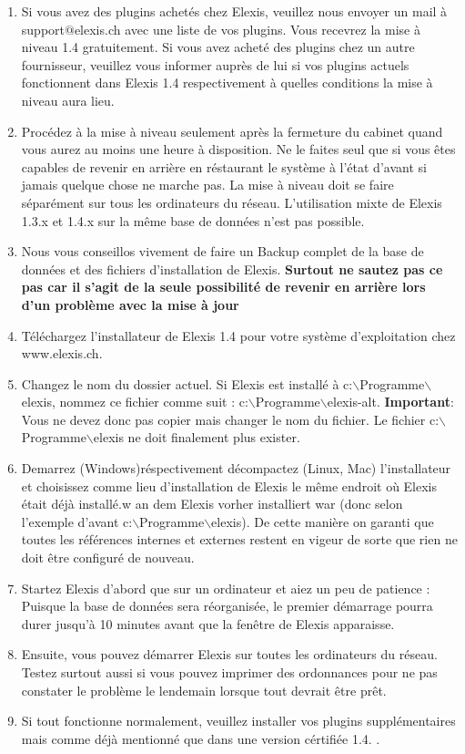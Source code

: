 \documentclass[a4paper]{scrartcl}
\begin{document}
\begin{enumerate}
\item Si vous avez des plugins achetés chez Elexis, veuillez nous envoyer un mail à  support$@$elexis.ch avec une liste de vos plugins. Vous recevrez la mise à niveau 1.4 gratuitement. Si vous avez acheté des plugins chez un autre fournisseur, veuillez vous informer auprès de lui si vos plugins actuels fonctionnent dans Elexis 1.4 respectivement à quelles conditions la mise à niveau aura lieu.

\item Procédez à la mise à niveau seulement après la fermeture du cabinet quand vous aurez au moins une heure à disposition. Ne le faites seul que si vous êtes capables de revenir en arrière en réstaurant le système à l'état d'avant si jamais quelque chose ne marche pas. La mise à niveau doit se faire séparément sur tous les ordinateurs du réseau. L'utilisation mixte de Elexis 1.3.x et 1.4.x sur la même base de données n'est pas possible.
\item Nous vous conseillos vivement de faire un Backup complet de la base de données et des fichiers d'installation de Elexis. \textbf{Surtout ne sautez pas ce pas car il s'agit de la seule possibilité de revenir en arrière lors d'un problème avec la mise à jour }
\item Téléchargez l'installateur de Elexis 1.4 pour votre système d'exploitation chez www.elexis.ch.
\item Changez le nom du dossier actuel. Si Elexis est installé à c:$\backslash$Programme$\backslash$elexis, nommez ce fichier comme suit : c:$\backslash$Programme$\backslash$elexis-alt. \textbf{Important}: Vous ne devez donc pas copier mais changer le nom du fichier. Le fichier c:$\backslash$Programme$\backslash$elexis ne doit finalement plus exister.
\item Demarrez (Windows)réspectivement décompactez (Linux, Mac) l'installateur et choisissez comme lieu d'installation de Elexis le même endroit où Elexis était déjà installé.w an dem Elexis vorher installiert war (donc selon l'exemple d'avant c:$\backslash$Programme$\backslash$elexis). De cette manière on garanti que toutes les références internes et externes restent en vigeur de sorte que rien ne doit être configuré de nouveau.  
\item Startez Elexis d'abord que sur un ordinateur et aiez un peu de patience : Puisque la base de données sera réorganisée, le premier démarrage pourra durer jusqu'à 10 minutes avant que la fenêtre de Elexis apparaisse. 
\item Ensuite, vous pouvez démarrer Elexis sur toutes les ordinateurs du réseau. Testez surtout aussi si vous pouvez imprimer des ordonnances pour ne pas constater le problème le lendemain lorsque tout devrait être prêt. 
\item Si tout fonctionne normalement, veuillez installer vos plugins supplémentaires  mais comme déjà mentionné que dans une version cértifiée 1.4. .
\end{enumerate}
\end{document}
